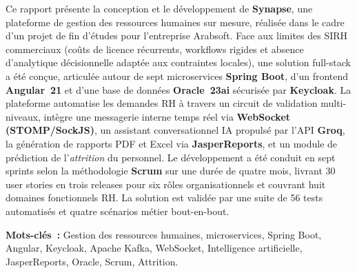 \documentclass[12pt,a4paper,oneside]{report}
\begin{document}
Ce rapport présente la conception et le développement de \textbf{Synapse}, une
plateforme de gestion des ressources humaines sur mesure, réalisée dans le cadre
d'un projet de fin d'études pour l'entreprise Arabsoft. Face aux limites des SIRH commerciaux (coûts de licence récurrents, workflows
rigides et absence d'analytique décisionnelle adaptée aux contraintes locales), une solution
full-stack a été conçue, articulée autour de sept microservices \textbf{Spring Boot},
d'un frontend \textbf{Angular~21} et d'une base de données \textbf{Oracle~23ai}
sécurisée par \textbf{Keycloak}. La plateforme automatise les demandes RH à travers
un circuit de validation multi-niveaux, intègre une messagerie interne temps réel
via \textbf{WebSocket (STOMP/SockJS)}, un assistant conversationnel IA propulsé
par l'API \textbf{Groq}, la génération de rapports PDF et Excel via
\textbf{JasperReports}, et un module de prédiction de l'\textit{attrition} du
personnel. Le développement a été conduit en sept sprints selon la méthodologie
\textbf{Scrum} sur une durée de quatre mois, livrant 30 user stories en trois
releases pour six rôles organisationnels et couvrant huit domaines fonctionnels RH.
La solution est validée par une suite de 56 tests automatisés et quatre scénarios
métier bout-en-bout.

\bigskip
\noindent\textbf{Mots-clés~:} Gestion des ressources humaines, microservices,
Spring Boot, Angular, Keycloak, Apache Kafka, WebSocket, Intelligence artificielle,
JasperReports, Oracle, Scrum, Attrition.
\end{document}
